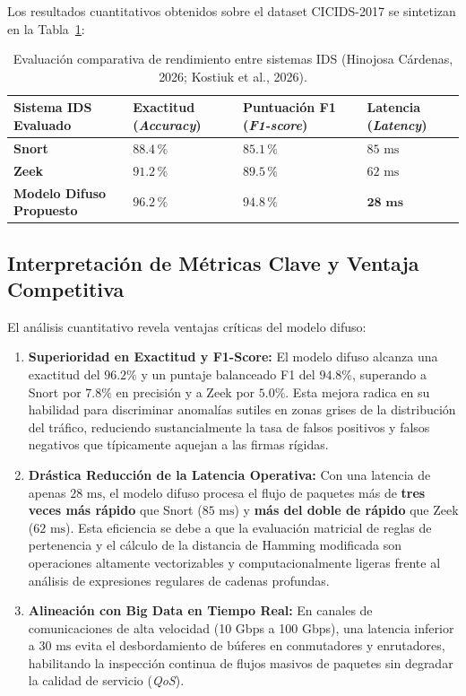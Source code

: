 \documentclass[12pt,a4paper]{article}
\begin{document}
Los resultados cuantitativos obtenidos sobre el dataset CICIDS-2017 se sintetizan en la Tabla~\ref{tab:benchmarking_ids}:

\begin{table}[H]
\centering
\caption{Evaluación comparativa de rendimiento entre sistemas IDS (Hinojosa Cárdenas, 2026; Kostiuk et al., 2026).}
\label{tab:benchmarking_ids}
\renewcommand{\arraystretch}{1.3}
\begin{tabularx}{0.92\textwidth}{>{\centering\arraybackslash}X >{\centering\arraybackslash}m{3.2cm} >{\centering\arraybackslash}m{3.2cm} >{\centering\arraybackslash}m{3.0cm}}
\toprule
\textbf{Sistema IDS Evaluado} & \textbf{Exactitud (\textit{Accuracy})} & \textbf{Puntuación F1 (\textit{F1-score})} & \textbf{Latencia (\textit{Latency})} \\
\midrule
\textbf{Snort} & $88.4\,\%$ & $85.1\,\%$ & $85\text{ ms}$ \\
\textbf{Zeek} & $91.2\,\%$ & $89.5\,\%$ & $62\text{ ms}$ \\
\textbf{Modelo Difuso Propuesto} & $\mathbf{96.2\,\%}$ & $\mathbf{94.8\,\%}$ & $\mathbf{28\text{ ms}}$ \\
\bottomrule
\end{tabularx}
\end{table}

\subsection*{Interpretación de Métricas Clave y Ventaja Competitiva}
El análisis cuantitativo revela ventajas críticas del modelo difuso:
\begin{enumerate}
    \item \textbf{Superioridad en Exactitud y F1-Score:} El modelo difuso alcanza una exactitud del $96.2\%$ y un puntaje balanceado F1 del $94.8\%$, superando a Snort por $7.8\%$ en precisión y a Zeek por $5.0\%$. Esta mejora radica en su habilidad para discriminar anomalías sutiles en zonas grises de la distribución del tráfico, reduciendo sustancialmente la tasa de falsos positivos y falsos negativos que típicamente aquejan a las firmas rígidas.
    \item \textbf{Drástica Reducción de la Latencia Operativa:} Con una latencia de apenas $28\text{ ms}$, el modelo difuso procesa el flujo de paquetes más de \textbf{tres veces más rápido} que Snort ($85\text{ ms}$) y \textbf{más del doble de rápido} que Zeek ($62\text{ ms}$). Esta eficiencia se debe a que la evaluación matricial de reglas de pertenencia y el cálculo de la distancia de Hamming modificada son operaciones altamente vectorizables y computacionalmente ligeras frente al análisis de expresiones regulares de cadenas profundas.
    \item \textbf{Alineación con Big Data en Tiempo Real:} En canales de comunicaciones de alta velocidad (10 Gbps a 100 Gbps), una latencia inferior a $30\text{ ms}$ evita el desbordamiento de búferes en conmutadores y enrutadores, habilitando la inspección continua de flujos masivos de paquetes sin degradar la calidad de servicio (\textit{QoS}).
\end{enumerate}
\end{document}

